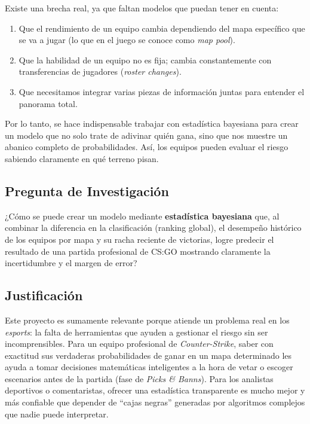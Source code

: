 \documentclass[twocolumn,10pt]{article}
\begin{document}
Existe una brecha real, ya que faltan modelos que puedan tener en cuenta:
\begin{enumerate}[noitemsep]
    \item Que el rendimiento de un equipo cambia dependiendo del mapa específico que se va a jugar (lo que en el juego se conoce como \textit{map pool}).
    \item Que la habilidad de un equipo no es fija; cambia constantemente con transferencias de jugadores (\textit{roster changes}).
    \item Que necesitamos integrar varias piezas de información juntas para entender el panorama total.
\end{enumerate}

Por lo tanto, se hace indispensable trabajar con estadística bayesiana para crear un modelo que no solo trate de adivinar quién gana, sino que nos muestre un abanico completo de probabilidades. Así, los equipos pueden evaluar el riesgo sabiendo claramente en qué terreno pisan.

\subsection{Pregunta de Investigación}

¿Cómo se puede crear un modelo mediante \textbf{estadística bayesiana} que, al combinar la diferencia en la clasificación (ranking global), el desempeño histórico de los equipos por mapa y su racha reciente de victorias, logre predecir el resultado de una partida profesional de CS:GO mostrando claramente la incertidumbre y el margen de error?

\subsection{Justificación}

Este proyecto es sumamente relevante porque atiende un problema real en los \textit{esports}: la falta de herramientas que ayuden a gestionar el riesgo sin ser incomprensibles. Para un equipo profesional de \textit{Counter-Strike}, saber con exactitud sus verdaderas probabilidades de ganar en un mapa determinado les ayuda a tomar decisiones matemáticas inteligentes a la hora de vetar o escoger escenarios antes de la partida (fase de \textit{Picks \& Banns}). Para los analistas deportivos o comentaristas, ofrecer una estadística transparente es mucho mejor y más confiable que depender de ``cajas negras'' generadas por algoritmos complejos que nadie puede interpretar.
\end{document}
